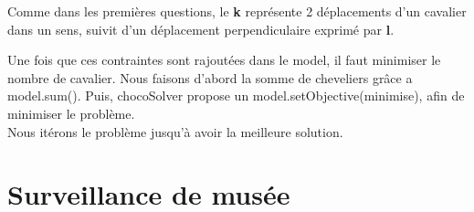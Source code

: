 \documentclass{article}
\begin{document}
 Comme dans les premières questions, le \textbf{k} représente 2 déplacements d'un cavalier dans un sens, suivit d'un déplacement perpendiculaire exprimé par \textbf{l}. 
 
 Une fois que ces contraintes sont rajoutées dans le model, il faut minimiser le nombre de cavalier. Nous faisons d'abord la somme de cheveliers grâce a model.sum(). Puis, chocoSolver propose un model.setObjective(minimise), afin de minimiser le problème.\\
 
 Nous itérons le problème jusqu'à avoir la meilleure solution. 
\section{Surveillance de musée}
\end{document}
